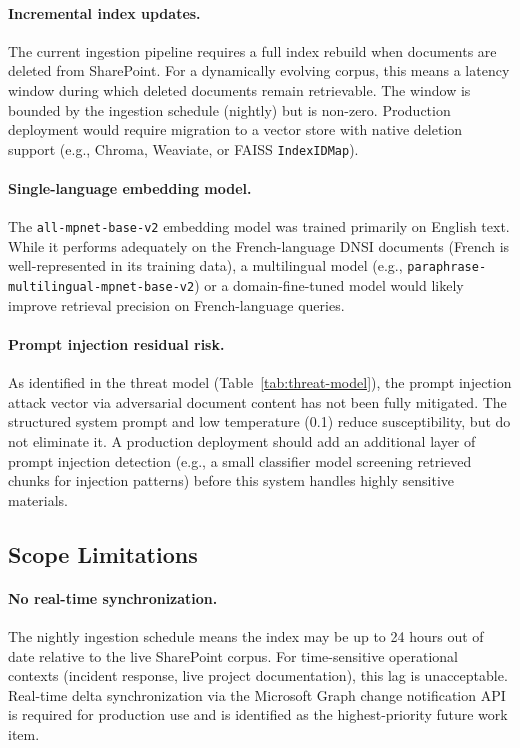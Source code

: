 \paragraph{Incremental index updates.} The current ingestion pipeline requires a full index rebuild when documents are deleted from SharePoint. For a dynamically evolving corpus, this means a latency window during which deleted documents remain retrievable. The window is bounded by the ingestion schedule (nightly) but is non-zero. Production deployment would require migration to a vector store with native deletion support (e.g., Chroma, Weaviate, or FAISS \texttt{IndexIDMap}).

\paragraph{Single-language embedding model.} The \texttt{all-mpnet-base-v2} embedding model was trained primarily on English text. While it performs adequately on the French-language DNSI documents (French is well-represented in its training data), a multilingual model (e.g., \texttt{paraphrase-multilingual-mpnet-base-v2}) or a domain-fine-tuned model would likely improve retrieval precision on French-language queries.

\paragraph{Prompt injection residual risk.} As identified in the threat model (Table~\ref{tab:threat-model}), the prompt injection attack vector via adversarial document content has not been fully mitigated. The structured system prompt and low temperature (0.1) reduce susceptibility, but do not eliminate it. A production deployment should add an additional layer of prompt injection detection (e.g., a small classifier model screening retrieved chunks for injection patterns) before this system handles highly sensitive materials.

\subsection{Scope Limitations}

\paragraph{No real-time synchronization.} The nightly ingestion schedule means the index may be up to 24 hours out of date relative to the live SharePoint corpus. For time-sensitive operational contexts (incident response, live project documentation), this lag is unacceptable. Real-time delta synchronization via the Microsoft Graph change notification API is required for production use and is identified as the highest-priority future work item.

